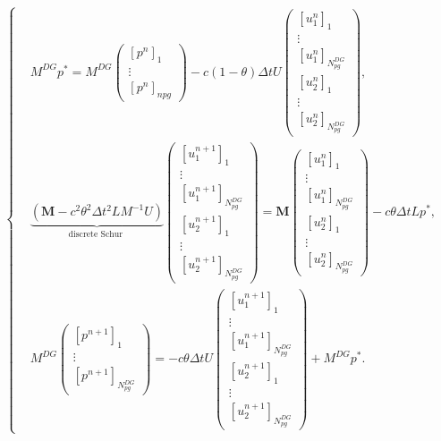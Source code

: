 \documentclass[a4paper, 11pt]{report}
\begin{document}
\begin{equation}
\left\{\begin{split}
&M^{DG}p^*=M^{DG}\begin{pmatrix}\left[p^{n}\right]_1\\ \vdots \\ \left[p^{n}\right]_{npg}\end{pmatrix}-c(1-\theta)\Delta tU\begin{pmatrix}[u^n_1]_1\\ \vdots\\ [u^n_1]_{N_{pg}^{DG}}\\ [u^n_2]_1\\ \vdots\\ [u^n_2]_{N_{pg}^{DG}}\end{pmatrix},\\
&\underbrace{\left(\boldsymbol{M}-c^2\theta^2\Delta t^2LM^{-1}U\right)}_{\text{discrete Schur }}\begin{pmatrix}\left[u_1^{n+1}\right]_1\\ \vdots \\ \left[u_1^{n+1}\right]_{N_{pg}^{DG}}\\ \left[u_2^{n+1}\right]_1\\ \vdots \\ \left[u_2^{n+1}\right]_{N_{pg}^{DG}}\end{pmatrix}=\boldsymbol{M}\begin{pmatrix}\left[u_1^n\right]_1\\ \vdots\\ \left[u_1^n\right]_{N_{pg}^{DG}}\\\left[u_2^n\right]_1\\ \vdots\\ \left[u_2^n\right]_{N_{pg}^{DG}}\end{pmatrix}-c\theta\Delta tLp^*,\\
&M^{DG}\begin{pmatrix}\left[p^{n+1}\right]_1\\ \vdots \\ \left[p^{n+1}\right]_{N_{pg}^{DG}}\end{pmatrix}=-c\theta\Delta tU\begin{pmatrix}\left[u_1^{n+1}\right]_1\\ \vdots \\ \left[u_1^{n+1}\right]_{N_{pg}^{DG}}\\ \left[u_2^{n+1}\right]_1\\ \vdots \\ \left[u_2^{n+1}\right]_{N_{pg}^{DG}}\end{pmatrix}+M^{DG}p^{*}.
\end{split}
\right.
\label{EQ_FINAL_DISCRETE}
\end{equation}
\end{document}
